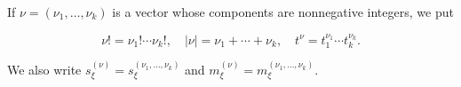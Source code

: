 If $\nu = (\nu_1, \ldots, \nu_k)$ is a vector whose components are nonnegative integers, we put

$$\nu! = \nu_1! \cdots \nu_k!, \quad |\nu| = \nu_1 + \cdots + \nu_k, \quad t^{\nu} = t_1^{\nu_1} \cdots t_k^{\nu_k}.$$

We also write $s_{\xi}^{(\nu)} = s_{\xi}^{(\nu_1, \ldots, \nu_k)}$ and $m_{\xi}^{(\nu)} = m_{\xi}^{(\nu_1, \ldots, \nu_k)}$.

